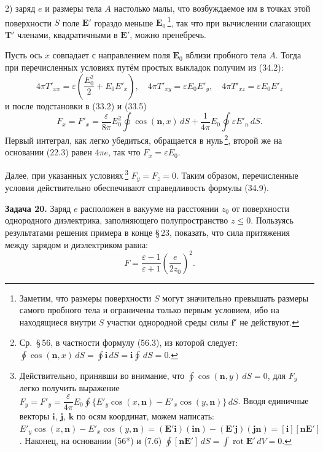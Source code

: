 \documentclass[a4paper,12pt]{article}
\begin{document}
2) заряд $e$ и размеры тела $A$ настолько малы, что возбуждаемое им
в точках этой поверхности $S$ поле $\mathbf{E}'$ гораздо меньше
$\mathbf{E}_0$\,\footnote{Заметим, что размеры поверхности $S$ могут
значительно превышать размеры самого пробного тела и ограничены только
первым условием, ибо на находящиеся внутри $S$ участки однородной среды
силы $\mathbf{f}'$ не действуют.}, так что при вычислении слагающих
$\mathbf{T}'$ членами, квадратичными в $\mathbf{E}'$, можно пренебречь.


Пусть ось $x$ совпадает с направлением поля $\mathbf{E}_0$ вблизи
пробного тела $A$. Тогда при перечисленных условиях путём простых
выкладок получим из (34.2):
$$
    4\pi T'_{xx} = \varepsilon\!\left(\frac{E_0^2}{2} + E_0 E'_x\right),
    \quad
    4\pi T'_{xy} = \varepsilon E_0 E'_y,
    \quad
    4\pi T'_{xz} = \varepsilon E_0 E'_z
$$
и после подстановки в (33.2) и (33.5)
$$
    F_x = F'_x = \frac{\varepsilon}{8\pi}E_0^2\oint\cos(\mathbf{n},x)\,dS
               + \frac{1}{4\pi}E_0\oint \varepsilon E'_n\,dS.
$$
Первый интеграл, как легко убедиться, обращается в нуль\,\footnote{Ср.\
§\,56, в частности формулу (56.3), из которой следует:
$\oint\cos(\mathbf{n},x)\,dS = \oint\mathbf{i}\,dS = \mathbf{i}\oint\,dS = 0$.},
второй же на основании (22.3) равен $4\pi e$, так что $F_x = \varepsilon E_0$.

Далее, при указанных условиях\,\footnote{Действительно, принявши во
внимание, что $\oint\cos(\mathbf{n},y)\,dS = 0$, для $F_y$ легко
получить выражение
$F_y = F'_y = \dfrac{\varepsilon}{4\pi}E_0\oint\{E'_y\cos(x,\mathbf{n})
- E'_x\cos(y,\mathbf{n})\}\,dS$.
Вводя единичные векторы $\mathbf{i}$, $\mathbf{j}$, $\mathbf{k}$
по осям координат, можем написать:
$E'_y\cos(x,\mathbf{n}) - E'_x\cos(y,\mathbf{n})
= (\mathbf{E}'\mathbf{i})(\mathbf{i}\mathbf{n}) - (\mathbf{E}'\mathbf{j})(\mathbf{j}\mathbf{n})
= [\mathbf{i}][\mathbf{n}\mathbf{E}']$.
Наконец, на основании (56*) и (7.6)
$\oint[\mathbf{n}\mathbf{E}']\,dS = \int\operatorname{rot}\mathbf{E}'\,dV = 0$.}
$F_y = F_z = 0$. Таким образом, перечисленные условия действительно
обеспечивают справедливость формулы (34.9).

\medskip
\noindent\textbf{Задача 20.} Заряд $e$ расположен в вакууме на расстоянии
$z_0$ от поверхности однородного диэлектрика, заполняющего полупространство
$z \leqslant 0$. Пользуясь результатами решения примера в конце §\,23,
показать, что сила притяжения между зарядом и диэлектриком равна:
$$
    F = \frac{\varepsilon - 1}{\varepsilon + 1}\left(\frac{e}{2z_0}\right)^2.
$$
\end{document}
